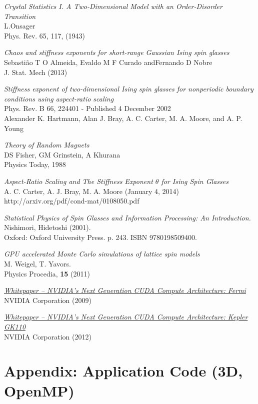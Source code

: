 \documentclass[paper=a4, fontsize=11pt]{scrartcl} %
\numberwithin{equation}{section} %
\numberwithin{figure}{section} %
\numberwithin{table}{section} %
\begin{document}
\pagebreak
\begin{thebibliography}{100}

\textit{Crystal Statistics I. A Two-Dimensional Model with an Order-Disorder Transition} \\
L.Onsager \\
Phys. Rev. 65, 117, (1943)

\textit{Chaos and stiffness exponents for short-range Gaussian Ising spin glasses} \\
Sebasti\~{a}o T O Almeida, Evaldo M F Curado andFernando D Nobre \\
J. Stat. Mech (2013)

\textit{Stiffness exponent of two-dimensional Ising spin glasses for nonperiodic boundary conditions using aspect-ratio scaling} \\
Phys. Rev. B 66, 224401 - Published 4 December 2002 \\
Alexander K. Hartmann, Alan J. Bray, A. C. Carter, M. A. Moore, and A. P. Young

\textit{Theory of Random Magnets} \\
DS Fisher, GM Grinstein, A Khurana \\
Physics Today, 1988 

\textit{Aspect-Ratio Scaling and The Stiffness Exponent $\theta$ for Ising Spin Glasses} \\
A. C. Carter, A. J. Bray, M. A. Moore (January 4, 2014) \\
http://arxiv.org/pdf/cond-mat/0108050.pdf

\textit{Statistical Physics of Spin Glasses and Information Processing: An Introduction.} \\
Nishimori, Hidetoshi (2001). \\
Oxford: Oxford University Press. p. 243. ISBN 9780198509400.

\textit{GPU accelerated Monte Carlo simulations of lattice spin models} \\
M. Weigel, T. Yavors. \\
Physics Procedia, \textbf{15} (2011)

\href{http://www.nvidia.com/content/pdf/fermi_white_papers/nvidia_fermi_compute_architecture_whitepaper.pdf}{\textit{Whitepaper -- NVIDIA's Next Generation CUDA Compute Architecture: Fermi}} \\
NVIDIA Corporation (2009)

\href{http://www.nvidia.com/content/pdf/kepler/NVIDIA-kepler-GK110-Architecture-Whitepaper.pdf}{\textit{Whitepaper -- NVIDIA's Next Generation CUDA Compute Architecture: Kepler GK110}} \\
NVIDIA Corporation (2012)

\end{thebibliography}

\pagebreak
\section*{Appendix: Application Code (3D, OpenMP)}

\end{document}
